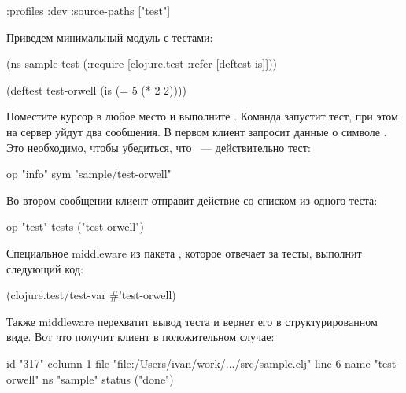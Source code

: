 \begin{english}
  \begin{clojure}
{:profiles
 {:dev
  {:source-paths ["test"]}}}
  \end{clojure}
\end{english}

Приведем минимальный модуль с тестами:

\begin{english}
  \begin{clojure}
(ns sample-test
  (:require
   [clojure.test :refer
     [deftest is]]))

(deftest test-orwell
  (is (= 5 (* 2 2))))
  \end{clojure}
\end{english}

Поместите курсор в любое место  и выполните . Команда запустит тест, при этом на сервер уйдут два сообщения. В первом клиент запросит данные о символе . Это необходимо, чтобы убедиться, что ~--- действительно тест:

\begin{english}
  \begin{text}
  op   "info"
  sym  "sample/test-orwell"
  \end{text}
\end{english}

Во втором сообщении клиент отправит действие  со списком из одного теста:

\begin{english}
  \begin{text}
  op     "test"
  tests  ("test-orwell")
  \end{text}
\end{english}

\pagebreaklarge

Специальное middleware из пакета , которое отвечает за тесты, выполнит следующий код:

\begin{english}
  \begin{clojure}
(clojure.test/test-var #'test-orwell)
  \end{clojure}
\end{english}

Также middleware перехватит вывод теста и вернет его в структурированном виде. Вот что получит клиент в положительном случае:

\begin{english}
  \begin{text}
  id      "317"
  column  1
  file    "file:/Users/ivan/work/.../src/sample.clj"
  line    6
  name    "test-orwell"
  ns      "sample"
  status  ("done")
  \end{text}
\end{english}

